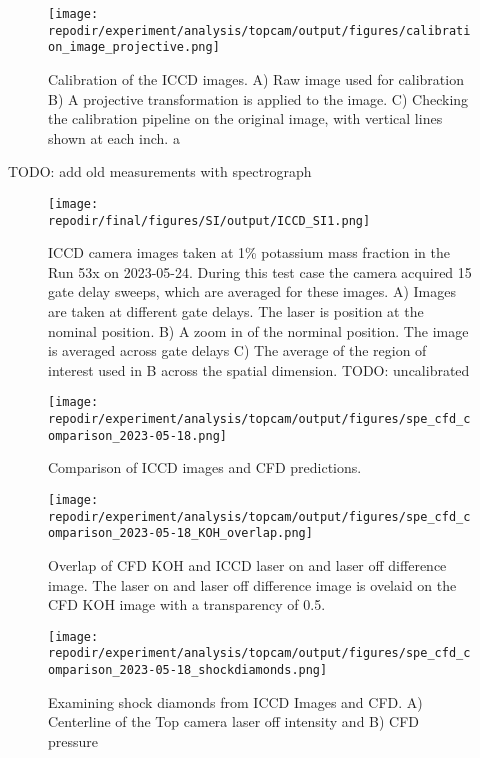 \begin{figure}[]
\centering
\texttt{[image: \\repodir/experiment/analysis/topcam/output/figures/calibration\_image\_projective.png]}
\caption{Calibration of the ICCD images. A) Raw image used for calibration B) A projective transformation is applied to the image. C) Checking the calibration pipeline on the original image, with vertical lines shown at each inch. a}
\label{fig:SI_iccd_calibration}
\end{figure}

TODO: add old measurements with spectrograph

\begin{figure}[]
\centering
\texttt{[image: \\repodir/final/figures/SI/output/ICCD\_SI1.png]}
\caption{ICCD camera images taken at 1\% potassium mass fraction in the Run 53x on 2023-05-24. During this test case the camera acquired 15 gate delay sweeps, which are averaged for these images. A) Images are taken at different gate delays. The laser is position at the nominal position. B) A zoom in of the norminal position. The image is averaged across gate delays C) The average of the region of interest used in B across the spatial dimension. TODO: uncalibrated}
\label{fig:SI_536_iccd}
\end{figure}


\begin{figure}[]
\centering
\texttt{[image: \\repodir/experiment/analysis/topcam/output/figures/spe\_cfd\_comparison\_2023-05-18.png]}
\caption{Comparison of ICCD images and CFD predictions. }
\label{fig:SI_iccd_cfd_comparison}
\end{figure}


\begin{figure}[]
\centering
\texttt{[image: \\repodir/experiment/analysis/topcam/output/figures/spe\_cfd\_comparison\_2023-05-18\_KOH\_overlap.png]}
\caption{Overlap of CFD KOH and ICCD laser on and laser off difference image. The laser on and laser off difference image is ovelaid on the CFD KOH image with a transparency of 0.5. }
\label{fig:SI_iccd_cfd_comparison_KOH_overlap}
\end{figure}

\begin{figure}
    \centering
    \texttt{[image: \\repodir/experiment/analysis/topcam/output/figures/spe\_cfd\_comparison\_2023-05-18\_shockdiamonds.png]} 
    \caption{Examining shock diamonds from ICCD Images and CFD. A) Centerline of the Top camera laser off intensity and B) CFD pressure}
    \label{fig:SI_iccd_cfd_comparison_KOH}
\end{figure}

